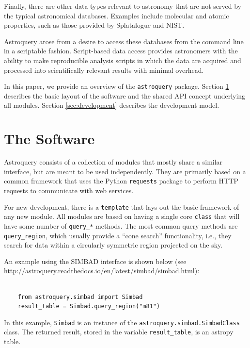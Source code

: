 \documentclass[twocolumn]{aastex61}
\begin{document}
Finally, there are other data types relevant to astronomy that are not
served by the typical astronomical databases.  Examples include molecular
and atomic properties, such as those provided by Splatalogue and NIST.

Astroquery arose from a desire to access these databases from the command line
in a scriptable fashion.  Script-based data access provides astronomers with
the ability to make reproducible analysis scripts in which the data are
acquired and processed into scientifically relevant results with minimal
overhead.

In this paper, we provide an overview of the \texttt{astroquery} package.
Section \ref{sec:software} describes the basic layout of the software and
the shared API concept underlying all modules.  Section \ref{sec:development}
describes the development model.



\section{The Software}
\label{sec:software}
Astroquery consists of a collection of modules that mostly share a similar
interface, but are meant to be used independently.  They are primarily based on
a common framework that uses the Python \texttt{requests} package to perform
HTTP requests to communicate with web services.

For new development, there is a \texttt{template}  that lays out the basic
framework of any new module.  All modules are based on having a single core
\texttt{class} that will have some number of \texttt{query\_*} methods.
The most common query methods are \texttt{query\_region}, which usually provide
a ``cone search'' functionality, i.e., they search for data within a circularly
symmetric region projected on the sky.

An example using the SIMBAD interface is shown below (see
\url{http://astroquery.readthedocs.io/en/latest/simbad/simbad.html}):
\begin{lstlisting}

    from astroquery.simbad import Simbad
    result_table = Simbad.query_region("m81")

\end{lstlisting}
In this example, \texttt{Simbad} is an instance of the
\texttt{astroquery.simbad.SimbadClass} class.
The returned result, stored in the variable \texttt{result\_table},
is an astropy table.
\end{document}
